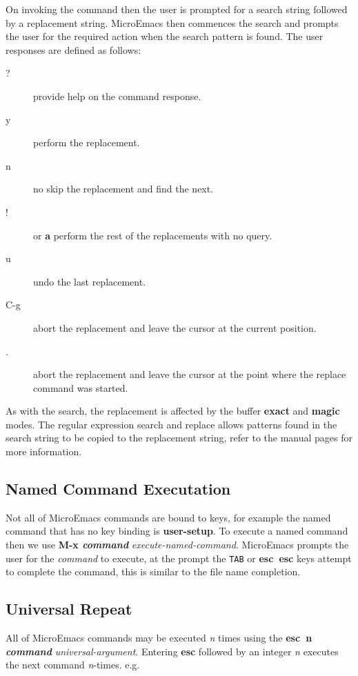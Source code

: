 \documentclass[11pt,a4paper,pdftex]{article}
\begin{document}
  On invoking the command then the user is prompted for a search string
  followed by a replacement string. MicroEmacs then commences the search and
  prompts the user for the required action when the search pattern is found.
  The user responses are defined as follows:

  \begin{description}
    \item[?] provide help on the command response.
    \item[y] perform the replacement.
    \item[n] no skip the replacement and find the next.
    \item[!] or \textbf{a} perform the rest of the replacements with no query.
    \item[u] undo the last replacement.
    \item[C-g] abort the replacement and leave the cursor at the current
    position.
    \item[.] abort the replacement and leave the cursor at the point where the
    replace command was started.
  \end{description}

  As with the search, the replacement is affected by the buffer \textbf{exact}
  and \textbf{magic} modes. The regular expression search and replace allows
  patterns found in the search string to be copied to the replacement string,
  refer to the manual pages for more information.

\subsection{Named Command Executation}

  Not all of MicroEmacs commands are bound to keys, for example the named
  command that has no key binding is \textbf{user-setup}. To execute a named
  command then we use \textbf{M-x \textit{command}}
  \textit{execute-named-command}. MicroEmacs prompts the user for the
  \textit{command} to execute, at the prompt the \texttt{TAB} or
  \textbf{esc~esc} keys attempt to complete the command, this is similar to
  the file name completion.

\subsection{Universal Repeat}

  All of MicroEmacs commands may be executed \textit{n} times using the
  \textbf{esc~n \textit{command}} \textit{universal-argument}. Entering
  \textbf{esc} followed by an integer \textit{n} executes the next command
  \textit{n}-times. e.g.
\end{document}
